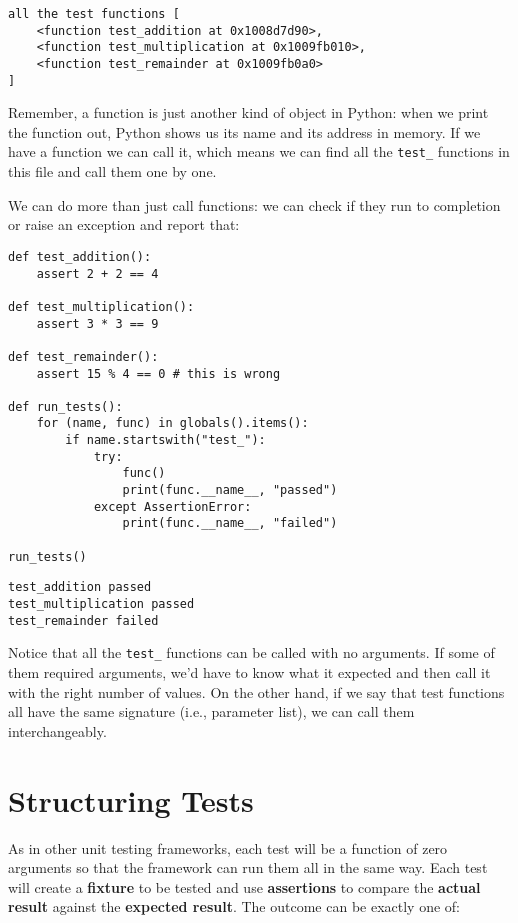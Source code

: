 \documentclass{scrbook}
\newcommand{\glossref}[1]{\textbf{#1}}
\begin{document}
\begin{lstlisting}[frame=single,frameround=tttt]
all the test functions [
    <function test_addition at 0x1008d7d90>,
    <function test_multiplication at 0x1009fb010>,
    <function test_remainder at 0x1009fb0a0>
]
\end{lstlisting}



Remember, a function is just another kind of object in Python:
when we print the function out,
Python shows us its name and its address in memory.
If we have a function we can call it,
which means we can find all the \texttt{test\_} functions in this file
and call them one by one.


We can do more than just call functions:
we can check if they run to completion or raise an exception
and report that:


\begin{lstlisting}[frame=single,frameround=tttt]
def test_addition():
    assert 2 + 2 == 4

def test_multiplication():
    assert 3 * 3 == 9

def test_remainder():
    assert 15 % 4 == 0 # this is wrong

def run_tests():
    for (name, func) in globals().items():
        if name.startswith("test_"):
            try:
                func()
                print(func.__name__, "passed")
            except AssertionError:
                print(func.__name__, "failed")

run_tests()
\end{lstlisting}

\begin{lstlisting}[frame=single,frameround=tttt]
test_addition passed
test_multiplication passed
test_remainder failed
\end{lstlisting}



Notice that all the \texttt{test\_} functions can be called with no arguments.
If some of them required arguments,
we'd have to know what it expected and then call it with the right number of values.
On the other hand,
if we say that test functions all have the same signature (i.e., parameter list),
we can call them interchangeably.

\section{Structuring Tests}\label{tester-structure}


As in other unit testing frameworks,
each test will be a function of zero arguments
so that the framework can run them all in the same way.
Each test will create a \glossref{fixture} to be tested
and use \glossref{assertions}
to compare the \glossref{actual result}
against the \glossref{expected result}.
The outcome can be exactly one of:
\end{document}
